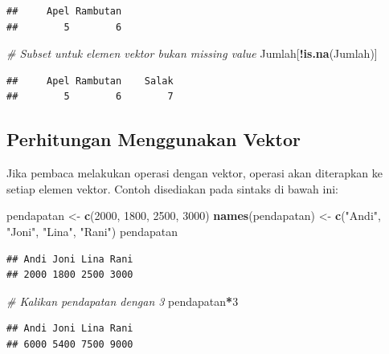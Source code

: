\documentclass[]{book}
\newenvironment{Shaded}{\begin{snugshade}}{\end{snugshade}}
\newcommand{\KeywordTok}[1]{\textcolor[rgb]{0.13,0.29,0.53}{\textbf{#1}}}
\newcommand{\DecValTok}[1]{\textcolor[rgb]{0.00,0.00,0.81}{#1}}
\newcommand{\StringTok}[1]{\textcolor[rgb]{0.31,0.60,0.02}{#1}}
\newcommand{\CommentTok}[1]{\textcolor[rgb]{0.56,0.35,0.01}{\textit{#1}}}
\newcommand{\OperatorTok}[1]{\textcolor[rgb]{0.81,0.36,0.00}{\textbf{#1}}}
\newcommand{\NormalTok}[1]{#1}
\begin{document}
\begin{verbatim}
##     Apel Rambutan 
##        5        6
\end{verbatim}

\begin{Shaded}
\begin{Highlighting}[]
\CommentTok{# Subset untuk elemen vektor bukan missing value}
\NormalTok{Jumlah[}\OperatorTok{!}\KeywordTok{is.na}\NormalTok{(Jumlah)]}
\end{Highlighting}
\end{Shaded}

\begin{verbatim}
##     Apel Rambutan    Salak 
##        5        6        7
\end{verbatim}

\subsection{Perhitungan Menggunakan
Vektor}\label{perhitungan-menggunakan-vektor}

Jika pembaca melakukan operasi dengan vektor, operasi akan diterapkan ke
setiap elemen vektor. Contoh disediakan pada sintaks di bawah ini:

\begin{Shaded}
\begin{Highlighting}[]
\NormalTok{pendapatan <-}\StringTok{ }\KeywordTok{c}\NormalTok{(}\DecValTok{2000}\NormalTok{, }\DecValTok{1800}\NormalTok{, }\DecValTok{2500}\NormalTok{, }\DecValTok{3000}\NormalTok{)}
\KeywordTok{names}\NormalTok{(pendapatan) <-}\StringTok{ }\KeywordTok{c}\NormalTok{(}\StringTok{"Andi"}\NormalTok{, }\StringTok{"Joni"}\NormalTok{, }\StringTok{"Lina"}\NormalTok{, }\StringTok{"Rani"}\NormalTok{)}
\NormalTok{pendapatan}
\end{Highlighting}
\end{Shaded}

\begin{verbatim}
## Andi Joni Lina Rani 
## 2000 1800 2500 3000
\end{verbatim}

\begin{Shaded}
\begin{Highlighting}[]
\CommentTok{# Kalikan pendapatan dengan 3}
\NormalTok{pendapatan}\OperatorTok{*}\DecValTok{3}
\end{Highlighting}
\end{Shaded}

\begin{verbatim}
## Andi Joni Lina Rani 
## 6000 5400 7500 9000
\end{verbatim}
\end{document}
